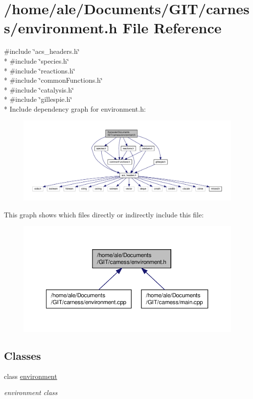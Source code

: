 \hypertarget{a00080}{\section{/home/ale/\-Documents/\-G\-I\-T/carness/environment.h File Reference}
\label{a00080}
}
{\ttfamily \#include \char`\"{}acs\-\_\-headers.\-h\char`\"{}}\\*
{\ttfamily \#include \char`\"{}species.\-h\char`\"{}}\\*
{\ttfamily \#include \char`\"{}reactions.\-h\char`\"{}}\\*
{\ttfamily \#include \char`\"{}common\-Functions.\-h\char`\"{}}\\*
{\ttfamily \#include \char`\"{}catalysis.\-h\char`\"{}}\\*
{\ttfamily \#include \char`\"{}gillespie.\-h\char`\"{}}\\*
Include dependency graph for environment.\-h\-:\nopagebreak
\begin{figure}[H]
\begin{center}
\leavevmode
\includegraphics[width=350pt]{a00127}
\end{center}
\end{figure}
This graph shows which files directly or indirectly include this file\-:\nopagebreak
\begin{figure}[H]
\begin{center}
\leavevmode
\includegraphics[width=350pt]{a00128}
\end{center}
\end{figure}
\subsection*{Classes}
\begin{DoxyCompactItemize}
\item 
class \hyperlink{a00008}{environment}
\begin{DoxyCompactList}\small\item\em environment class \end{DoxyCompactList}\end{DoxyCompactItemize}
